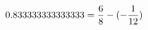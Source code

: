 \documentclass[preview]{standalone}
\begin{document}
\begin{align*}
\special{dvisvgm:raw <g id='unique000'>}0.833333333333333 = \frac{6}{8} - (- \frac{1}{12})\special{dvisvgm:raw </g>}
\end{align*}
\end{document}

